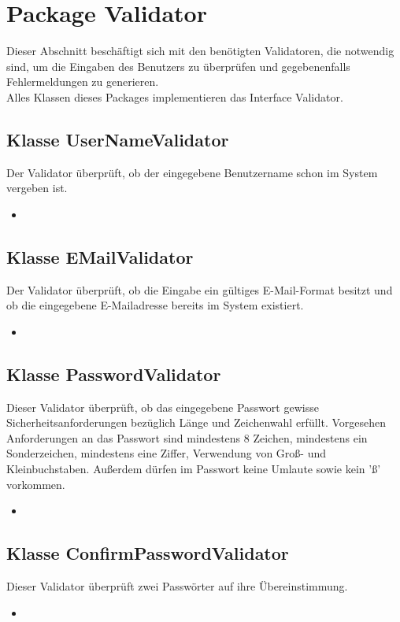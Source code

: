 	\section{Package Validator}
	Dieser Abschnitt beschäftigt sich mit den benötigten Validatoren, die notwendig sind, um die Eingaben des Benutzers zu überprüfen und gegebenenfalls Fehlermeldungen zu generieren.\\
	Alles Klassen dieses Packages implementieren das Interface Validator.
	
	\subsection{Klasse UserNameValidator}
	Der Validator überprüft, ob der eingegebene Benutzername schon im System vergeben ist.
	\begin{itemize}
		\item \override
	\end{itemize}
	
	\subsection{Klasse EMailValidator}
	Der Validator überprüft, ob die Eingabe ein gültiges E-Mail-Format besitzt und ob die eingegebene E-Mailadresse bereits im System existiert.
	\begin{itemize}
		\item \override
	\end{itemize}
	
	\subsection{Klasse PasswordValidator}
	Dieser Validator überprüft, ob das eingegebene Passwort gewisse Sicherheitsanforderungen bezüglich Länge und Zeichenwahl erfüllt. Vorgesehen Anforderungen an das Passwort sind mindestens 8 Zeichen, mindestens ein Sonderzeichen, mindestens eine Ziffer, Verwendung von Groß- und Kleinbuchstaben. Außerdem dürfen im Passwort keine Umlaute sowie kein 'ß' vorkommen.
	\begin{itemize}
		\item \override
	\end{itemize}
	
	\subsection{Klasse ConfirmPasswordValidator}
	Dieser Validator überprüft zwei Passwörter auf ihre Übereinstimmung.
	\begin{itemize}
		\item \override
	\end{itemize}
	
